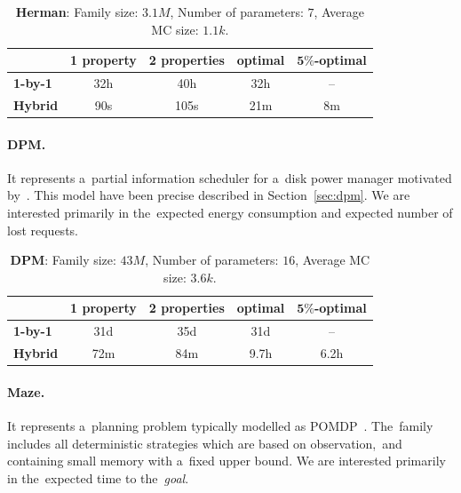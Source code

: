 \begin{table}[h!]
\centering
\begin{tabular}{l|cccc}
    \hline \hline 
    & \multicolumn{1}{l}{\textbf{1 property}} & \multicolumn{1}{l}{\textbf{2 properties}} & \multicolumn{1}{l}{\textbf{optimal}} & \multicolumn{1}{l}{\textbf{$\mathbf{5\%}$-optimal}} \\ \hline
    \textbf{1-by-1} & 32h & 40h & 32h & \,--\, \\
    \textbf{Hybrid} & 90s & 105s & 21m & 8m \\ \hline \hline
\end{tabular}
\caption{\textbf{Herman}: Family size: $3.1M$, Number of parameters: $7$, Average MC size: $1.1k$.}
\end{table}

\paragraph{DPM.}
It represents a~partial information scheduler for a~disk power manager motivated by~\cite{dpm1}.
This model have been precise described in Section~\ref{sec:dpm}.
We are interested primarily in the~expected energy consumption and expected number of lost requests.

\vspace*{-0.4cm}
\begin{table}[h!]
\centering
\begin{tabular}{l|cccc}
    \hline \hline 
    & \multicolumn{1}{l}{\textbf{1 property}} & \multicolumn{1}{l}{\textbf{2 properties}} & \multicolumn{1}{l}{\textbf{optimal}} & \multicolumn{1}{l}{\textbf{$\mathbf{5\%}$-optimal}} \\ \hline
    \textbf{1-by-1} & 31d & 35d & 31d & \,--\, \\
    \textbf{Hybrid} & 72m & 84m & 9.7h & 6.2h \\ \hline \hline
\end{tabular}
\caption{\textbf{DPM}:  Family size: $43M$, Number of parameters: $16$, Average MC size: $3.6k$.}
\end{table}

\vspace*{-0.4cm}
\paragraph{Maze.}
It represents a~planning problem typically modelled as POMDP~\cite{maze}.
The~family includes all deterministic strategies which are based on observation,~and containing small memory with a~fixed upper bound.
We are interested primarily in the~expected time to the~\emph{goal}.

